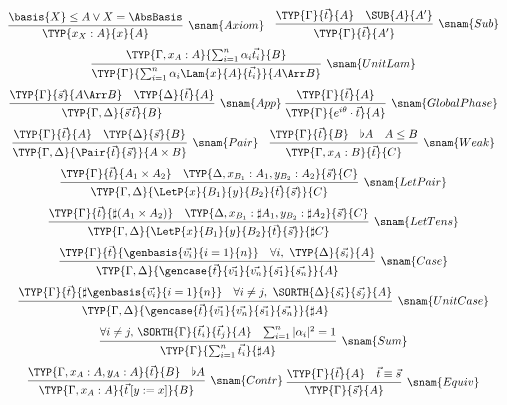 \begin{table*}
    \small
    $
    \begin{array}{c}
    \infer[\snam{Axiom}]{\TYP{x_X:A}{x}{A}}{\basis{X}\leq A \vee X=\AbsBasis}\quad
    \infer[\snam{Sub}]{\TYP{\Gamma}{\vec{t}}{A'}}{
        \TYP{\Gamma}{\vec{t}}{A} & \SUB{A}{A'}
    }\\
    \noalign{\medskip}
    \infer[\snam{UnitLam}]{
        \TYP{\Gamma}{\sum_{i=1}^n \alpha_i \Lam{x}{A}{\vec{t_i}}}{A\Arr B}
    }{\TYP{\Gamma,x_A: A}{\sum_{i=1}^{n}\alpha_i\vec{t_i}}{B}
    }\\
    \noalign{\medskip}
    \infer[\snam{App}]{\TYP{\Gamma,\Delta}{\vec{s}\,\vec{t}}{B}}{
        \TYP{\Gamma}{\vec{s}}{A\Arr B} & \TYP{\Delta}{\vec{t}}{A}
    }\ 
    \infer[\snam{GlobalPhase}]{\TYP{\Gamma}{e^{i\theta}\cdot\vec{t}}{A}}
    {\TYP{\Gamma}{\vec{t}}{A}}
    \\
    \noalign{\medskip}
    \infer[\snam{Pair}]{\TYP{\Gamma,\Delta}
        {\Pair{\vec{t}}{\vec{s}}}{A\times B}}{
        \TYP{\Gamma}{\vec{t}}{A}&\TYP{\Delta}{\vec{s}}{B}
    }\quad
    \infer[\snam{Weak}]{\TYP{\Gamma,x_A:B}{\vec{t}}{C}}{
        \TYP{\Gamma}{\vec{t}}{B}& \flat{A} & A\leq B
    }
    \\
    \noalign{\medskip}
    \infer[\snam{LetPair}]{\TYP{\Gamma,\Delta} 
        {\LetP{x}{B_1}{y}{B_2}{\vec{t}}{\vec{s}}}{C}}{
        \TYP{\Gamma}{\vec{t}}{A_1\times A_2}&
        \TYP{\Delta,x_{B_1}:A_1,y_{B_2}:A_2}{\vec{s}}{C}
    }\\
    \noalign{\medskip}
    \infer[\snam{LetTens}]{\TYP{\Gamma,\Delta}
        {\LetP{x}{B_1}{y}{B_2}{\vec{t}}{\vec{s}}}{\sharp C}}{
        \TYP{\Gamma}{\vec{t}}{\sharp(A_1\times A_2)}&
        \TYP{\Delta,x_{B_1}:\sharp A_1,y_{B_2}:\sharp A_2}{\vec{s}}{C}
    }\\
    \noalign{\medskip}
    \infer[\snam{Case}]{\TYP{\Gamma,\Delta}
        {\gencase{\vec{t}}{\vec{v_1}}{\vec{v_n}}{\vec{s_1}}{\vec{s_n}}}{A}}{
        \TYP{\Gamma}{\vec{t}}{\genbasis{\vec{v_i}}{i=1}{n}}&
        \forall i,\ \TYP{\Delta}{\vec{s_i}}{A}
    }\\
    \noalign{\medskip}
    \infer[\snam{UnitCase}]{\TYP{\Gamma,\Delta}
        {\gencase{\vec{t}}{\vec{v_1}}{\vec{v_n}}{\vec{s_1}}{\vec{s_n}}}{\sharp A}}{
        \TYP{\Gamma}{\vec{t}}{\sharp \genbasis{\vec{v_i}}{i=1}{n}}&
        \forall i\neq j,\ \SORTH{\Delta}{\vec{s_i}}{\vec{s_j}}{A}
    }\\
    \noalign{\medskip}
    \infer[\snam{Sum}]
        {\TYP{\Gamma}{\sum_{i=1}^{n} \vec{t_i}}{\sharp A}}
        {\forall i\neq j,\, \SORTH{\Gamma}{\vec t_i}{\vec t_j}{A} &
        \sum_{i=1}^{n}|\alpha_i|^2 = 1}
    \\
    \noalign{\medskip}
    \infer[\snam{Contr}]{\TYP{\Gamma,x_A:A}{\vec{t}\,[y:=x]}{B}}{
        \TYP{\Gamma,x_A:A,y_A:A}{\vec{t}}{B}&\flat{A}
    }\ 
    \infer[\snam{Equiv}]{\TYP{\Gamma}{\vec{s}}{A}}{
        \TYP{\Gamma}{\vec{t}}{A}& \vec t\equiv \vec s
    }\\
    \noalign{\medskip}
    \end{array}
    $


\end{table*}

